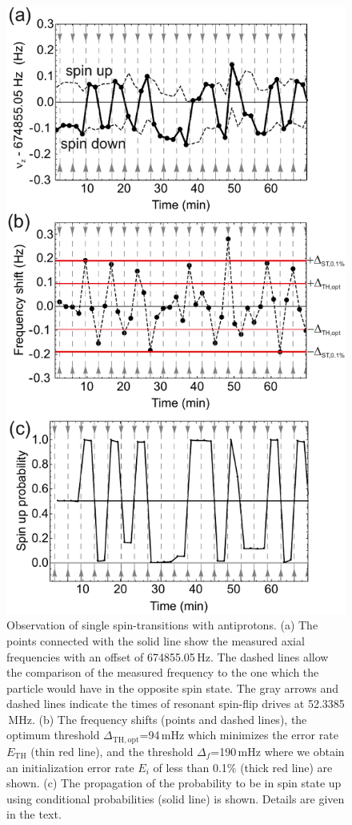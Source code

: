 \documentclass[preprint%
]{elsarticle}
\begin{document}
\begin{figure}[htb]
\centerline{\includegraphics[width=0.45 \textwidth,keepaspectratio]{FIG4SSF.pdf}}
\caption[Filter]{Observation of single spin-transitions with antiprotons. (a) The points connected with the solid line show the measured axial frequencies with an offset of 674855.05$\,$Hz. The dashed lines allow the comparison of the measured frequency to the one which the particle would have in the opposite spin state. The gray arrows and dashed lines indicate the times of resonant spin-flip drives at 52.3385$\,$MHz. (b) The frequency shifts (points and dashed lines), the optimum threshold $\Delta_{\mathrm{TH,opt}}$=94$\,$mHz which minimizes the error rate $E_{\mathrm{TH}}$ (thin red line), and the threshold $\Delta_{f}$=190$\,$mHz where we obtain an initialization error rate $E_{i}$ of less than 0.1$\%$ (thick red line) are shown. (c) The propagation of the probability to be in spin state up using conditional probabilities (solid line) is shown. Details are given in the text.} 
\label{fig5}
\end{figure}
\end{document}
